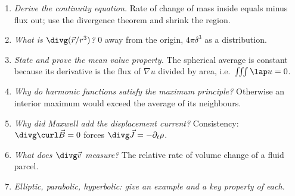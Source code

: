 \begin{interview}
\begin{enumerate}
  \item \emph{Derive the continuity equation.} Rate of change of mass inside equals minus flux out; use the divergence theorem and shrink the region.
  \item \emph{What is $\divg(\vec r/r^3)$?} $0$ away from the origin, $4\pi\delta^3$ as a distribution.
  \item \emph{State and prove the mean value property.} The spherical average is constant because its derivative is the flux of $\nabla u$ divided by area, i.e.\ $\iiint\lap u=0$.
  \item \emph{Why do harmonic functions satisfy the maximum principle?} Otherwise an interior maximum would exceed the average of its neighbours.
  \item \emph{Why did Maxwell add the displacement current?} Consistency: $\divg\curl\vec B=0$ forces $\divg\vec J=-\partial_t\rho$.
  \item \emph{What does $\divg\vec v$ measure?} The relative rate of volume change of a fluid parcel.
  \item \emph{Elliptic, parabolic, hyperbolic: give an example and a key property of each.}
\end{enumerate}
\end{interview}

